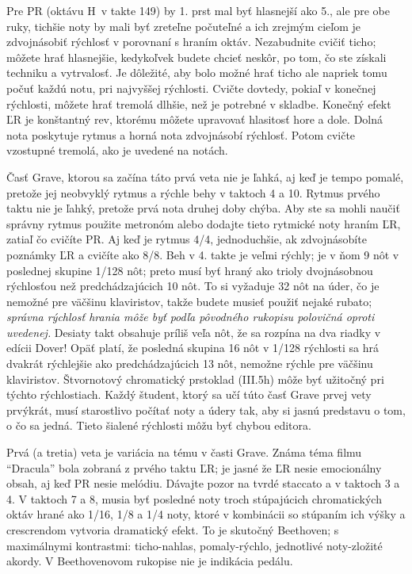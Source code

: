 Pre PR (oktávu H\flat\ v takte 149) by 1. prst mal byť hlasnejší ako 5., ale pre obe ruky, tichšie noty by mali byť zreteľne počuteľné a ich zrejmým cieľom je zdvojnásobiť rýchlosť v porovnaní s hraním oktáv. Nezabudnite cvičiť ticho; môžete hrať hlasnejšie, kedykoľvek budete chcieť neskôr, po tom, čo ste získali techniku a vytrvalosť. Je dôležité, aby bolo možné hrať ticho ale napriek tomu počuť každú notu, pri najvyššej rýchlosti. Cvičte dovtedy, pokiaľ v konečnej rýchlosti, môžete hrať tremolá dlhšie, než je potrebné v skladbe. Konečný efekt ĽR je konštantný rev, ktorému môžete upravovať hlasitosť hore a dole. Dolná nota poskytuje rytmus a horná nota zdvojnásobí rýchlosť. Potom cvičte vzostupné tremolá, ako je uvedené na notách.

Časť Grave, ktorou sa začína táto prvá veta nie je ľahká, aj keď je tempo pomalé, pretože jej neobvyklý rytmus a rýchle behy v taktoch 4 a 10. Rytmus prvého taktu nie je ľahký, pretože prvá nota druhej doby chýba. Aby ste sa mohli naučiť správny rytmus použite metronóm alebo dodajte tieto rytmické noty hraním ĽR, zatiaľ čo cvičíte PR. Aj keď je rytmus 4/4, jednoduchšie, ak zdvojnásobíte poznámky ĽR a cvičíte ako 8/8. Beh v 4. takte je veľmi rýchly; je v ňom 9 nôt v poslednej skupine 1/128 nôt; preto musí byť hraný ako trioly dvojnásobnou rýchlosťou než predchádzajúcich 10 nôt. To si vyžaduje 32 nôt na úder, čo je nemožné pre väčšinu klaviristov, takže budete musieť použiť nejaké rubato; \emph{správna rýchlosť hrania môže byť podľa pôvodného rukopisu polovičná oproti uvedenej.} Desiaty takt obsahuje príliš veľa nôt, že sa rozpína na dva riadky v edícii Dover! Opäť platí, že posledná skupina 16 nôt v 1/128 rýchlosti sa hrá dvakrát rýchlejšie ako predchádzajúcich 13 nôt, nemožne rýchle pre väčšinu klaviristov. Štvornotový chromatický prstoklad (III.5h) môže byť užitočný pri týchto rýchlostiach. Každý študent, ktorý sa učí túto časť Grave prvej vety prvýkrát, musí starostlivo počítať noty a údery tak, aby si jasnú predstavu o tom, o čo sa jedná. Tieto šialené rýchlosti môžu byť chybou editora.

Prvá (a tretia) veta je variácia na tému v časti Grave. Známa téma filmu “Dracula” bola zobraná z prvého taktu ĽR; je jasné že ĽR nesie emocionálny obsah, aj keď PR nesie melódiu. Dávajte pozor na tvrdé staccato a  v taktoch 3 a 4. V taktoch 7 a 8, musia byť posledné noty troch stúpajúcich chromatických oktáv hrané ako 1/16, 1/8 a 1/4 noty, ktoré v kombinácii so stúpaním ich výšky a crescrendom vytvoria dramatický efekt. To je skutočný  Beethoven; s maximálnymi kontrastmi: ticho-nahlas, pomaly-rýchlo, jednotlivé noty-zložité akordy. V Beethovenovom rukopise nie je indikácia pedálu.

